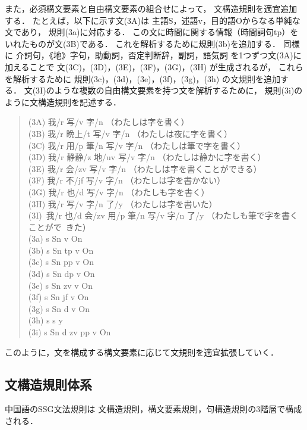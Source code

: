 \documentclass[japanese]{jnlp_1.3a}
\begin{document}
また，必須構文要素と自由構文要素の組合せによって，
文構造規則を適宜追加する．
たとえば，以下に示す文(3A)は
主語S，述語v，目的語Oからなる単純な文であり，
規則(3a)に対応する．
この文に時間に関する情報（時間詞句tp）をいれたものが文(3B)である．
これを解析するために規則(3b)を追加する．
同様に
介詞句，《地》字句，助動詞，否定判断辞，副詞，語気詞
を1つずつ文(3A)に加えることで
文(3C)，(3D)，(3E)，(3F)，(3G)，(3H)
が生成されるが，
これらを解析するために
規則(3c)，(3d)，(3e)，(3f)，(3g)，(3h)
の文規則を追加する．
文(3I)のような複数の自由構文要素を持つ文を解析するために，
規則(3i)のように文構造規則を記述する．
\begin{quotation}\noindent
\文(3A) 我/r 写/v 字/n （わたしは字を書く）\\
\文(3B) 我/r 晩上/t 写/v 字/n （わたしは夜に字を書く）\\
\文(3C) 我/r 用/p 筆/n 写/v 字/n （わたしは筆で字を書く）\\
\文(3D) 我/r 静静/z 地/uv 写/v 字/n （わたしは静かに字を書く）\\
\文(3E) 我/r 会/zv 写/v 字/n （わたしは字を書くことができる）\\
\文(3F) 我/r 不/jf 写/v 字/n （わたしは字を書かない）\\
\文(3G) 我/r 也/d 写/v 字/n （わたしも字を書く）\\
\文(3H) 我/r 写/v 字/n 了/y （わたしは字を書いた）\\
\文(3I)~我/r 也/d 会/zv 用/p 筆/n 写/v 字/n 了/y （わたしも筆で字を書くことがで\hspace*{4zw}~きた）\\
(3a) s \ya Sn v On\\
(3b) s \ya Sn tp v On\\
(3c) s \ya Sn pp v On\\
(3d) s \ya Sn dp v On\\
(3e) s \ya Sn zv v On\\
(3f) s \ya Sn jf v On\\
(3g) s \ya Sn d v On \\
(3h) s \ya s y\\
(3i) s \ya Sn d zv pp v On
\end{quotation}
このように，文を構成する構文要素に応じて文規則を適宜拡張していく．

\subsection{文構造規則体系}
中国語のSSG文法規則は
文構造規則，構文要素規則，句構造規則の3階層で構成される．
\end{document}
